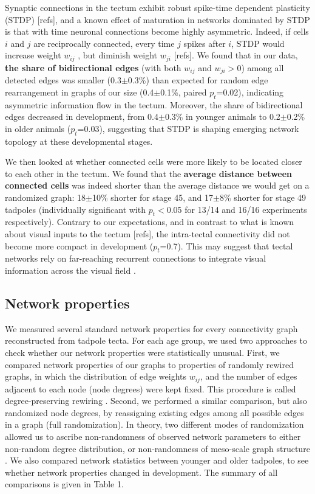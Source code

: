 \documentclass{article}
\begin{document}
Synaptic connections in the tectum exhibit robust spike-time dependent plasticity (STDP) \citep{mu2006stdp,pratt2008recurrent}[refs], and a known effect of maturation in networks dominated by STDP is that with time neuronal connections become highly asymmetric. Indeed, if cells $i$ and $j$ are reciprocally connected, every time $j$ spikes after $i$, STDP would increase weight $w_{ij}$ , but diminish weight $w_{ji}$ \citep{abbott1996ltpsequence}[refs]. We found that in our data, \textbf{the share of bidirectional edges} (with both $w_{ij}$ and $w_{ji}>$0) among all detected edges was smaller (0.3$\pm$0.3\%) than expected for random edge rearrangement in graphs of our size (0.4$\pm$0.1\%, paired $p_t$=0.02), indicating asymmetric information flow in the tectum. Moreover, the share of bidirectional edges decreased in development, from 0.4$\pm$0.3\% in younger animals to 0.2$\pm$0.2\% in older animals ($p_t$=0.03), suggesting that STDP is shaping emerging network topology at these developmental stages.

We then looked at whether connected cells were more likely to be located closer to each other in the tectum. We found that the \textbf{average distance between connected cells} was indeed shorter than the average distance we would get on a randomized graph: 18$\pm$10\% shorter for stage 45, and 17$\pm$8\% shorter for stage 49 tadpoles (individually significant with $p_t<$0.05 for 13/14 and 16/16 experiments respectively). Contrary to our expectations, and in contrast to what is known about visual inputs to the tectum \citep{tao2005refinement}[refs], the intra-tectal connectivity did not become more compact in development ($p_t$=0.7). This may suggest that tectal networks rely on far-reaching recurrent connections to integrate visual information across the visual field \citep{baginskas2009recurrent,liu2016jumbo,jang2016}.

\subsection*{Network properties}

We measured several standard network properties for every connectivity graph reconstructed from tadpole tecta. For each age group, we used two approaches to check whether our network properties were statistically unusual. First, we compared network properties of our graphs to properties of randomly rewired graphs, in which the distribution of edge weights $w_{ij}$, and the number of edges adjacent to each node (node degrees) were kept fixed. This procedure is called degree-preserving rewiring \citep{maslov2002}. Second, we performed a similar comparison, but also randomized node degrees, by reassigning existing edges among all possible edges in a graph (full randomization). In theory, two different modes of randomization allowed us to ascribe non-randomness of observed network parameters to either non-random degree distribution, or non-randomness of meso-scale graph structure \citep{ansmann2012surrogate}. We also compared network statistics between younger and older tadpoles, to see whether network properties changed in development. The summary of all comparisons is given in Table 1.
\end{document}
